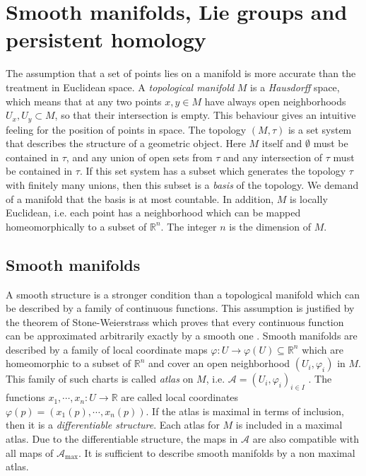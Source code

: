 \documentclass[runningheads,orivec]{llncs}
\begin{document}
\section{Smooth manifolds, Lie groups and persistent homology}
The assumption that a set of points lies on a manifold is more accurate than the treatment in Euclidean space. A \emph{topological manifold} $M$ is a \emph{Hausdorff} space, which means that at any two points $x,y \in M$ have always open neighborhoods $U_x,U_y \subset M$, so that their intersection is empty. This behaviour gives an intuitive feeling for the position of points in space. The topology $(M, \tau)$ is a set system that describes the structure of a geometric object. Here $M$ itself and $\emptyset$ must be contained in $\tau$, and any union of open sets from $\tau$ and any intersection of $\tau$ must be contained in $\tau$. If this set system has a subset which generates the topology $\tau$ with finitely many unions, then this subset is a \emph{basis} of the topology. We demand of a manifold that the basis is at most countable. In addition, $M$ is locally Euclidean, i.e. each point has a neighborhood which can be mapped homeomorphically to a subset of $\mathbb{R}^n$. The integer $n$ is the dimension of $M$. 

\subsection{Smooth manifolds}
A smooth structure is a stronger condition than a topological manifold which can be described by a family of continuous functions. This assumption is justified by the theorem of Stone-Weierstrass which proves that every continuous function can be approximated arbitrarily exactly by a smooth one \cite{stone1948generalized}. Smooth manifolds are described by a family of local coordinate maps $\varphi: U \rightarrow \varphi(U) \subseteq \mathbb{R}^n$ which are homeomorphic to a subset of $\mathbb{R}^{n}$ and cover an open neighborhood $(U_i,\varphi_i)$ in $M$. This family of such charts is called \emph{atlas} on $M$, i.e. $\mathscr{A} = (U_i,\varphi_i)_{i \in I}$ \cite{lee2013smooth}. The functions $x_1, \cdots, x_n: U \rightarrow \mathbb{R}$ are called local coordinates $\varphi(p) = (x_1(p), \cdots, x_n(p))$. If the atlas is maximal in terms of inclusion, then it is a \emph{differentiable structure}. Each atlas for $M$ is included in a maximal atlas. Due to the differentiable structure, the maps in $\mathscr{A}$ are also compatible with all maps of $\mathscr{A}_{\text{max}}$. It is sufficient to describe smooth manifolds by a non maximal atlas.
\end{document}
